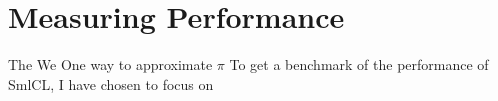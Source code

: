 \section{Measuring Performance}

The 
We 
One way to approximate $\pi$ To get a benchmark of the performance of SmlCL, I have chosen to focus
on 
